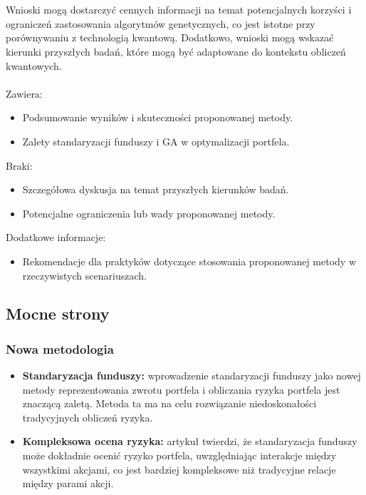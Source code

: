 \documentclass[polish,envcountsect,10pt]{article}
\begin{document}
\begin{enumerate}[I.]
            \\
            \\
            Wnioski mogą dostarczyć cennych informacji na temat potencjalnych korzyści i ograniczeń zastosowania algorytmów genetycznych, co jest istotne przy porównywaniu z technologią kwantową. Dodatkowo, wnioski mogą wskazać kierunki przyszłych badań, które mogą być adaptowane do kontekstu obliczeń kwantowych.
            \\
            \\
            Zawiera:
                \begin{itemize}
                  \item Podsumowanie wyników i skuteczności proponowanej metody.
                  \item Zalety standaryzacji funduszy i GA w optymalizacji portfela.
                \end{itemize}
            Braki:
                \begin{itemize}
                  \item Szczegółowa dyskusja na temat przyszłych kierunków badań.
                  \item Potencjalne ograniczenia lub wady proponowanej metody.
                \end{itemize}
            Dodatkowe informacje:
                \begin{itemize}
                  \item Rekomendacje dla praktyków dotyczące stosowania proponowanej metody w rzeczywistych scenariuszach.
                \end{itemize}
\end{enumerate}

\subsection{Mocne strony}

\subsubsection{Nowa metodologia}

\begin{itemize}
	\item \textbf{Standaryzacja funduszy:}
    wprowadzenie standaryzacji funduszy jako nowej metody reprezentowania zwrotu portfela i obliczania ryzyka portfela jest znaczącą zaletą. Metoda ta ma na celu rozwiązanie niedoskonałości tradycyjnych obliczeń ryzyka.
	\item \textbf{Kompleksowa ocena ryzyka:}
    artykuł twierdzi, że standaryzacja funduszy może dokładnie ocenić ryzyko portfela, uwzględniając interakcje między wszystkimi akcjami, co jest bardziej kompleksowe niż tradycyjne relacje między parami akcji.
\end{itemize}
\end{document}
